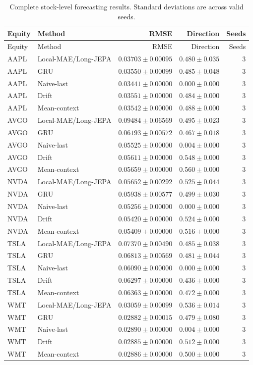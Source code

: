 \begin{longtable}{llrrr}
\caption{Complete stock-level forecasting results. Standard deviations are across valid seeds.}\label{tab:appendix_stock_metrics}\\
\toprule
Equity & Method & RMSE & Direction & Seeds \\
\midrule
\endfirsthead
\toprule
Equity & Method & RMSE & Direction & Seeds \\
\midrule
\endhead
AAPL & Local-MAE/Long-JEPA & $0.03703 \pm 0.00095$ & $0.480 \pm 0.035$ & 3 \\
AAPL & GRU & $0.03550 \pm 0.00099$ & $0.485 \pm 0.048$ & 3 \\
AAPL & Naive-last & $0.03441 \pm 0.00000$ & $0.000 \pm 0.000$ & 3 \\
AAPL & Drift & $0.03551 \pm 0.00000$ & $0.484 \pm 0.000$ & 3 \\
AAPL & Mean-context & $0.03542 \pm 0.00000$ & $0.488 \pm 0.000$ & 3 \\
AVGO & Local-MAE/Long-JEPA & $0.09484 \pm 0.06569$ & $0.495 \pm 0.023$ & 3 \\
AVGO & GRU & $0.06193 \pm 0.00572$ & $0.467 \pm 0.018$ & 3 \\
AVGO & Naive-last & $0.05525 \pm 0.00000$ & $0.004 \pm 0.000$ & 3 \\
AVGO & Drift & $0.05611 \pm 0.00000$ & $0.548 \pm 0.000$ & 3 \\
AVGO & Mean-context & $0.05659 \pm 0.00000$ & $0.560 \pm 0.000$ & 3 \\
NVDA & Local-MAE/Long-JEPA & $0.05652 \pm 0.00292$ & $0.525 \pm 0.044$ & 3 \\
NVDA & GRU & $0.05938 \pm 0.00577$ & $0.499 \pm 0.030$ & 3 \\
NVDA & Naive-last & $0.05256 \pm 0.00000$ & $0.000 \pm 0.000$ & 3 \\
NVDA & Drift & $0.05420 \pm 0.00000$ & $0.524 \pm 0.000$ & 3 \\
NVDA & Mean-context & $0.05409 \pm 0.00000$ & $0.516 \pm 0.000$ & 3 \\
TSLA & Local-MAE/Long-JEPA & $0.07370 \pm 0.00490$ & $0.485 \pm 0.038$ & 3 \\
TSLA & GRU & $0.06813 \pm 0.00569$ & $0.481 \pm 0.044$ & 3 \\
TSLA & Naive-last & $0.06090 \pm 0.00000$ & $0.000 \pm 0.000$ & 3 \\
TSLA & Drift & $0.06297 \pm 0.00000$ & $0.436 \pm 0.000$ & 3 \\
TSLA & Mean-context & $0.06363 \pm 0.00000$ & $0.472 \pm 0.000$ & 3 \\
WMT & Local-MAE/Long-JEPA & $0.03059 \pm 0.00099$ & $0.536 \pm 0.014$ & 3 \\
WMT & GRU & $0.02882 \pm 0.00015$ & $0.479 \pm 0.080$ & 3 \\
WMT & Naive-last & $0.02890 \pm 0.00000$ & $0.004 \pm 0.000$ & 3 \\
WMT & Drift & $0.02885 \pm 0.00000$ & $0.512 \pm 0.000$ & 3 \\
WMT & Mean-context & $0.02886 \pm 0.00000$ & $0.500 \pm 0.000$ & 3 \\
\bottomrule
\end{longtable}
